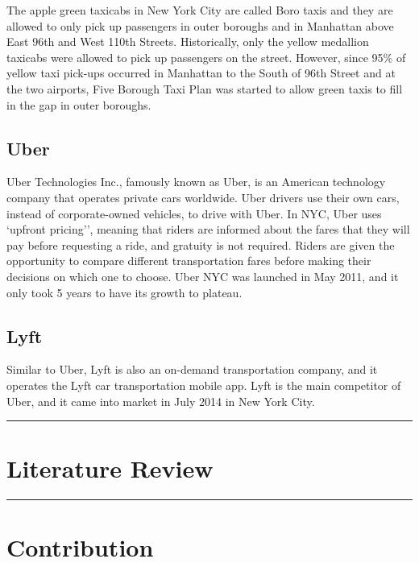 \documentclass[12pt,twoside]{reedthesis}
\theoremstyle{definition}
\theoremstyle{definition}
\theoremstyle{definition}
\theoremstyle{remark}
\begin{document}
The apple green taxicabs in New York City are called Boro taxis and they
are allowed to only pick up passengers in outer boroughs and in
Manhattan above East 96th and West 110th Streets. Historically, only the
yellow medallion taxicabs were allowed to pick up passengers on the
street. However, since 95\% of yellow taxi pick-ups occurred in
Manhattan to the South of 96th Street and at the two airports, Five
Borough Taxi Plan was started to allow green taxis to fill in the gap in
outer boroughs.

\subsection{Uber}\label{uber}

Uber Technologies Inc., famously known as Uber, is an American
technology company that operates private cars worldwide. Uber drivers
use their own cars, instead of corporate-owned vehicles, to drive with
Uber. In NYC, Uber uses `upfront pricing'', meaning that riders are
informed about the fares that they will pay before requesting a ride,
and gratuity is not required. Riders are given the opportunity to
compare different transportation fares before making their decisions on
which one to choose. Uber NYC was launched in May 2011, and it only took
5 years to have its growth to plateau.

\subsection{Lyft}\label{lyft}

Similar to Uber, Lyft is also an on-demand transportation company, and
it operates the Lyft car transportation mobile app. Lyft is the main
competitor of Uber, and it came into market in July 2014 in New York
City.
\begin{center}\rule{0.5\linewidth}{\linethickness}\end{center}

\section{Literature Review}\label{literature-review}
\begin{center}\rule{0.5\linewidth}{\linethickness}\end{center}

\section{Contribution}\label{contribution}
\end{document}
